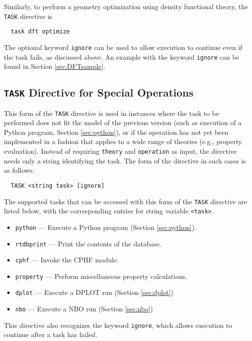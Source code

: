 Similarly, to perform a geometry optimization using density functional
theory, the \verb+TASK+ directive is
\begin{verbatim}
  task dft optimize
\end{verbatim}

The optional keyword \verb+ignore+ can be used to allow execution to
continue even if the task fails, as discussed above.
An example with the keyword \verb+ignore+
can be found in Section \ref{sec:DFTsample}.

\subsection{{\tt TASK} Directive for Special Operations}

This form of the \verb+TASK+ directive is used in instances where the
task to be performed does not fit the model of the previous version
(such as execution of a Python program, Section \ref{sec:python}), or
if the operation has not yet been implemented in a fashion that
applies to a wide range of theories (e.g., property evaluation).
Instead of requiring \verb+theory+ and \verb+operation+ as input, the
directive needs only a string identifying the task.  The form of the
directive in such cases is as follows:

\begin{verbatim}
  TASK <string task> [ignore]
\end{verbatim}

The supported tasks that can be accessed with this form of the \verb+TASK+
directive are listed
below, with the corresponding entries for string variable \verb+<task>+.

\begin{itemize}
  \item \verb+python+ --- Execute a Python program (Section \ref{sec:python}).
  \item \verb+rtdbprint+ --- Print the contents of the database.
  \item \verb+cphf+ --- Invoke the CPHF module.
  \item \verb+property+ --- Perform miscellaneous property calculations.
  \item \verb+dplot+ --- Execute a DPLOT run (Section \ref{sec:dplot})
  \item \verb+nbo+ --- Execute a NBO run (Section \ref{sec:nbo})
\end{itemize}

This directive also recognizes the keyword \verb+ignore+, which allows
execution to continue after a task has failed.

